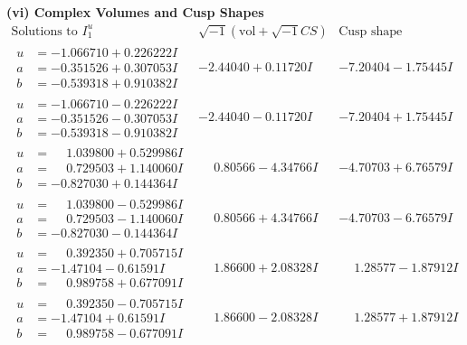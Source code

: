 \documentclass[1p]{elsarticle_modified}
\theoremstyle{definition}
\newcommand{\I}{\sqrt{-1}}
\begin{document}
\newpage\flushleft \textbf{(vi) Complex Volumes and Cusp Shapes}
$$\begin{array}{c|c|c}  
\text{Solutions to }I^u_{1}& \I (\text{vol} + \sqrt{-1}CS) & \text{Cusp shape}\\
 \hline 
\begin{aligned}
u &= -1.066710 + 0.226222 I \\
a &= -0.351526 + 0.307053 I \\
b &= -0.539318 + 0.910382 I\end{aligned}
 & -2.44040 + 0.11720 I & -7.20404 - 1.75445 I \\ \hline\begin{aligned}
u &= -1.066710 - 0.226222 I \\
a &= -0.351526 - 0.307053 I \\
b &= -0.539318 - 0.910382 I\end{aligned}
 & -2.44040 - 0.11720 I & -7.20404 + 1.75445 I \\ \hline\begin{aligned}
u &= \phantom{-}1.039800 + 0.529986 I \\
a &= \phantom{-}0.729503 + 1.140060 I \\
b &= -0.827030 + 0.144364 I\end{aligned}
 & \phantom{-}0.80566 - 4.34766 I & -4.70703 + 6.76579 I \\ \hline\begin{aligned}
u &= \phantom{-}1.039800 - 0.529986 I \\
a &= \phantom{-}0.729503 - 1.140060 I \\
b &= -0.827030 - 0.144364 I\end{aligned}
 & \phantom{-}0.80566 + 4.34766 I & -4.70703 - 6.76579 I \\ \hline\begin{aligned}
u &= \phantom{-}0.392350 + 0.705715 I \\
a &= -1.47104 - 0.61591 I \\
b &= \phantom{-}0.989758 + 0.677091 I\end{aligned}
 & \phantom{-}1.86600 + 2.08328 I & \phantom{-}1.28577 - 1.87912 I \\ \hline\begin{aligned}
u &= \phantom{-}0.392350 - 0.705715 I \\
a &= -1.47104 + 0.61591 I \\
b &= \phantom{-}0.989758 - 0.677091 I\end{aligned}
 & \phantom{-}1.86600 - 2.08328 I & \phantom{-}1.28577 + 1.87912 I \\ \hline\begin{aligned}

\end{aligned}
\end{array}$$
\end{document}
